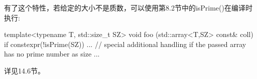 有了这个特性，若给定的大小不是质数，可以使用第8.2节中的isPrime()在编译时执行:

\begin{cpp}
template<typename T, std::size_t SZ>
void foo (std::array<T,SZ> const& coll)
{
	if constexpr(!isPrime(SZ)) {
		... // special additional handling if the passed array has no prime number as size
	}
	...
}
\end{cpp}

详见14.6节。



























